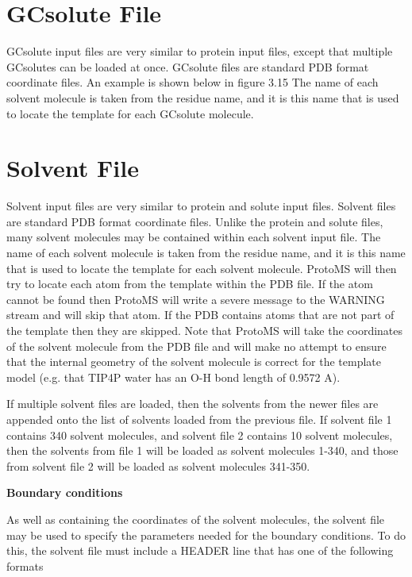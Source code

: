 \documentclass[letterpaper,10pt,english]{sphinxmanual}
\begin{document}
\section{GCsolute File}
\label{protoms:gcsolute-file}
GCsolute input files are very similar to protein input files, except that multiple GCsolutes can be loaded at once. GCsolute files are standard PDB format coordinate files. An example is shown below in figure 3.15 The name of each solvent molecule is taken from the residue name, and it is this name that is used to locate the template for each GCsolute molecule.


\section{Solvent File}
\label{protoms:solvent-file}
Solvent input files are very similar to protein and solute input files. Solvent files are standard PDB format coordinate files. Unlike the protein and solute files, many solvent molecules may be contained within each solvent input file. The name of each solvent molecule is taken from the residue name, and it is this name that is used to locate the template for each solvent molecule. ProtoMS will then try to locate each atom from the template within the PDB file. If the atom cannot be found then ProtoMS will write a severe message to the WARNING stream and will skip that atom. If the PDB contains atoms that are not part of the template then they are skipped. Note that ProtoMS will take the coordinates of the solvent molecule from the PDB file and will make no attempt to ensure that the internal geometry of the solvent molecule is correct for the template model (e.g. that
TIP4P water has an O-H bond length of 0.9572 A).

If multiple solvent files are loaded, then the solvents from the newer files are appended onto the list of solvents loaded from the previous file. If solvent file 1 contains 340 solvent molecules, and solvent file 2 contains 10 solvent molecules, then the solvents from file 1 will be loaded as solvent molecules 1-340, and those from solvent file 2 will be loaded as solvent molecules 341-350.

\textbf{Boundary conditions}

As well as containing the coordinates of the solvent molecules, the solvent file may be used to specify the parameters needed for the boundary conditions. To do this, the solvent file must include a HEADER line that has one of the following formats
\end{document}
